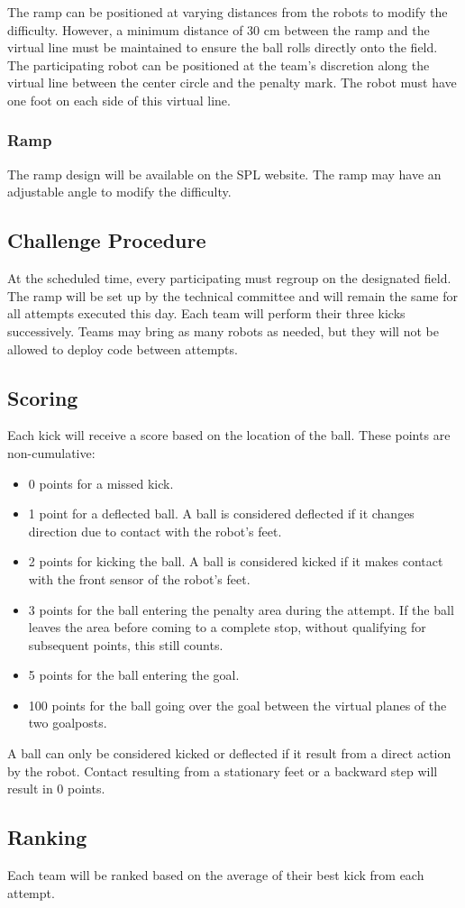 The ramp can be positioned at varying distances from the robots to modify the difficulty.
However, a minimum distance of 30 cm between the ramp and the virtual line must be maintained to ensure the ball rolls directly onto the field.
The participating robot can be positioned at the team’s discretion along the virtual line between the center circle and the penalty mark.
The robot must have one foot on each side of this virtual line.

\subsubsection{Ramp}

The ramp design will be available on the SPL website.
The ramp may have an adjustable angle to modify the difficulty.


\subsection{Challenge Procedure}

At the scheduled time, every participating must regroup on the designated field. 
The ramp will be set up by the technical committee and will remain the same for all attempts executed this day.
Each team will perform their three kicks successively.
Teams may bring as many robots as needed, but they will not be allowed to deploy code between attempts.

\subsection{Scoring}

Each kick will receive a score based on the location of the ball.
These points are non-cumulative: 

\begin{itemize}
	\item 0 points for a missed kick.
	\item 1 point for a deflected ball.
	A ball is considered deflected if it changes direction due to contact with the robot's feet.
	\item 2 points for kicking the ball.
	A ball is considered kicked if it makes contact with the front sensor of the robot's feet.
	\item 3 points for the ball entering the penalty area during the attempt. 
	If the ball leaves the area before coming to a complete stop, without qualifying for subsequent points, this still counts. 
	\item 5 points for the ball entering the goal. 
	\item 100 points for the ball going over the goal between the virtual planes of the two goalposts. 
  \end{itemize}

  A ball can only be considered kicked or deflected if it result from a direct action by the robot.
  Contact resulting from a stationary feet or a backward step will result in 0 points.

  \subsection{Ranking}

  Each team will be ranked based on the average of their best kick from each attempt.
